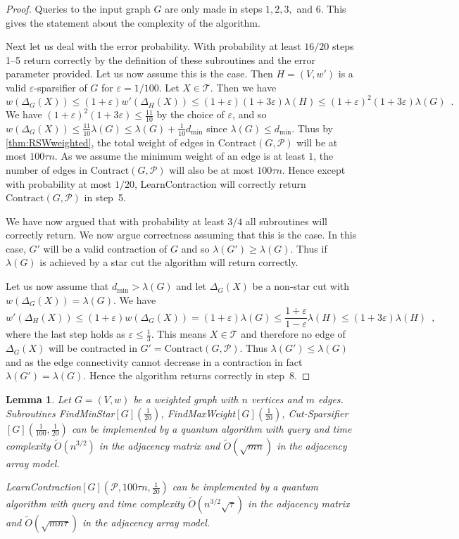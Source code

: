 \documentclass[10pt,a4paper]{article}
\newcommand{\Pcal}{\mathcal{P}}
\newcommand{\Tcal}{\mathcal{T}}
\newcommand{\Contract}{\mathrm{Contract}}
\newcommand{\tO}{\tilde O}
\newcommand{\1}{\mathbf{1}}
\newtheorem{lemma}[theorem]{Lemma}
\theoremstyle{definition}
\begin{document}
\begin{proof}
Queries to the input graph $G$ are only made in steps $1,2,3,$ and $6$. This gives the statement about the complexity of the algorithm.  

Next let us deal with the error probability.  With probability at least $16/20$ steps 1--5 return correctly by the definition of these subroutines and 
the error parameter provided.  Let us now assume this is the case.   Then $H =(V,w')$ is a valid $\varepsilon$-sparsifier of $G$ for $\varepsilon = 1/100$.  
Let $X \in \Tcal$.  Then we have 
\[
w(\Delta_G(X)) \le (1+\varepsilon) w'(\Delta_H(X)) \le (1+\varepsilon)(1+3\varepsilon)\lambda(H) \le (1+\varepsilon)^2(1+3\varepsilon)\lambda(G) \enspace .
\]
We have $(1+\varepsilon)^2(1+3\varepsilon) \le \frac{11}{10}$ by the choice of $\varepsilon$, and so $w(\Delta_G(X)) \leq \frac{11}{10} \lambda(G) \leq \lambda(G) + \frac{1}{10} d_{\min}$ 
since $\lambda(G) \le d_{\min}$.  Thus by \cref{thm:RSWweighted}, the total weight of edges in $\Contract(G, \Pcal)$ will be at most $100\tau n$.
As we assume the minimum weight of an edge is at least $1$, the number of edges in $\Contract(G, \Pcal)$ will also be at most $100\tau n$. 
Hence except with probability at most $1/20$, LearnContraction will correctly return $\Contract(G, \Pcal)$ in step~5.

We have now argued that with probability at least $3/4$ all subroutines will correctly return.  We now argue correctness assuming that this is the case.  
In this case, $G'$ will be a valid contraction of $G$ and so $\lambda(G') \ge \lambda(G)$.  Thus if $\lambda(G)$ is achieved by a star cut the 
algorithm will return correctly.  

Let us now assume that $d_{\min} > \lambda(G)$ and let $\Delta_G(X)$ be a non-star cut with $w(\Delta_G(X)) = \lambda(G)$.  We have 
\[
w'(\Delta_H(X)) \le (1+\varepsilon) w(\Delta_G(X)) = (1+\varepsilon) \lambda(G) \le \frac{1+\varepsilon}{1-\varepsilon} \lambda(H) \le (1+3\varepsilon) \lambda(H)\enspace ,
\]
where the last step holds as $\varepsilon \le \frac{1}{3}$.  This means $X \in \Tcal$ and therefore no edge of $\Delta_G(X)$ will be 
contracted in $G' = \Contract(G,\Pcal)$.  Thus $\lambda(G') \le \lambda(G)$ and as the edge connectivity cannot decrease in a contraction in fact $\lambda(G') = \lambda(G)$.
Hence the algorithm returns correctly in step~8.
\end{proof}

\begin{lemma} \label{lem:compl-subroutines}
Let $G = (V,w)$ be a weighted graph with $n$ vertices and $m$ edges.
Subroutines FindMinStar$[G](\frac{1}{20})$, FindMaxWeight$[G](\frac{1}{20})$, Cut-Sparsifier$[G](\frac{1}{100}, \frac{1}{20})$ can be implemented by a quantum algorithm 
with query and time complexity  $\tO(n^{3/2})$ in the adjacency matrix and $\tO(\sqrt{mn})$ in the adjacency array model.  

LearnContraction$[G](\Pcal, 100 \tau n, \frac{1}{20})$ can be implemented by a quantum algorithm with query and time complexity  
$\tO(n^{3/2}\sqrt{\tau})$ in the adjacency matrix and $\tO(\sqrt{mn\tau})$ in the adjacency array model.
\end{lemma}
\end{document}
